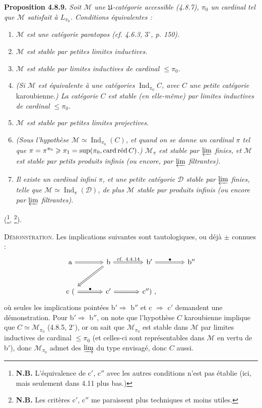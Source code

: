 \documentclass[11pt]{article}
\newcommand{\msp}[1]{\marginpar{\footnotesize [#1]}}
\newcommand{\card}{\operatorname{card}}
\newcommand{\Ind}{\operatorname{Ind}}
\begin{document}
\msp{page 207}
\textbf{Proposition 4.8.9.} \textit{Soit $\mathcal{M}$ une $\mathfrak{U}$-catégorie accessible (4.8.7), $\pi_0$ un cardinal tel que $\mathcal{M}$ satisfait à $L_{\pi_0}$. Conditions équivalentes :}
\begin{enumerate}
\item[\textit{a)}] \textit{$\mathcal{M}$ est une catégorie paratopos (cf. 4.6.3, $3^\circ$, p. 150).}
\item[\textit{b)}] \textit{$\mathcal{M}$ est stable par petites limites inductives.}
\item[\textit{b$'$)}] \textit{$\mathcal{M}$ est stable par limites inductives de cardinal $\leqslant\pi_0$.}
\item[\textit{b$''$)}] \textit{(Si $\mathcal{M}$ est équivalente à une catégories} $\Ind_{\pi_0}C$\textit{, avec $C$ une petite catégorie} karoubienne.\textit{) La catégorie $C$ est stable (en elle-même) par limites inductives de cardinal $\leqslant\pi_0$.} %
\item[\textit{c)}] \textit{$\mathcal{M}$ est stable par petites limites projectives.}
\item[\textit{c$'$)}] \textit{(Sous l'hypothèse $\mathcal{M}\simeq\Ind_{\pi_0}(C)$, et quand on se donne un cardinal $\pi$ tel que $\pi=\pi^{\pi_0}\geqslant\pi_1=\sup(\pi_0,\card\textup{réd}\,C)$.) $\mathcal{M}_\pi$ est stable par $\varprojlim$ finies, et $\mathcal{M}$ est stable par petits produits infinis (ou encore, par $\varprojlim$ filtrantes).}
\item[\textit{c$''$)}] \textit{Il existe un cardinal infini $\pi$, et une petite catégorie $\mathcal{D}$ stable par $\varprojlim$ finies, telle que $\mathcal{M}\simeq\Ind_\pi(\mathcal{D})$, de plus $\mathcal{M}$ stable par produits infinis (ou encore par $\varprojlim$ filtrantes).}
\end{enumerate}
(\footnote{\textbf{N.B.} L'équivalence de c$'$, c$''$ avec les autres conditions n'est pas établie (ici, mais seulement dans 4.11 plus bas.)}, \footnote{\textbf{N.B.} Les critères c$'$, c$''$ me paraissent plus techniques et moins utiles.}).

\textsc{Démonstration.} Les implications suivantes sont tautologiques, ou déjà $\pm$ connues :
\[
\begin{tikzcd}[column sep=large, row sep=large]
\mathrm{a} \arrow[r, Rightarrow] & \mathrm{b} \arrow[r, Rightarrow, "\text{cf. 4.4.14}"] \arrow[dl, Rightarrow] & \mathrm{b}' \arrow[r, Rightarrow, "\bullet"] & \mathrm{b}'' \\
\mathrm{c}\ ( \arrow[r, Rightarrow, "\bullet"] & \mathrm{c}' \arrow[r, Rightarrow] & \mathrm{c}'')\ , &
\end{tikzcd}
\]
\msp{page 208}
où seules les implications pointées b$'\Longrightarrow$ b$''$ et c $\Longrightarrow$ c$'$ demandent une démonstration. Pour b$'\Longrightarrow$ b$''$, on note que l'hypothèse $C$ karoubienne implique que $C\simeq\mathcal{M}_{\pi_0}$ (4.8.5, $2^\circ$), or on sait que $\mathcal{M}_{\pi_0}$ est stable dans $\mathcal{M}$ par limites inductives de cardinal $\leqslant\pi_0$ (et celles-ci sont représentables dans $\mathcal{M}$ en vertu de b$'$), donc $\mathcal{M}_{\pi_0}$ admet des $\varinjlim$ du type envisagé, donc $C$ aussi.
\end{document}
